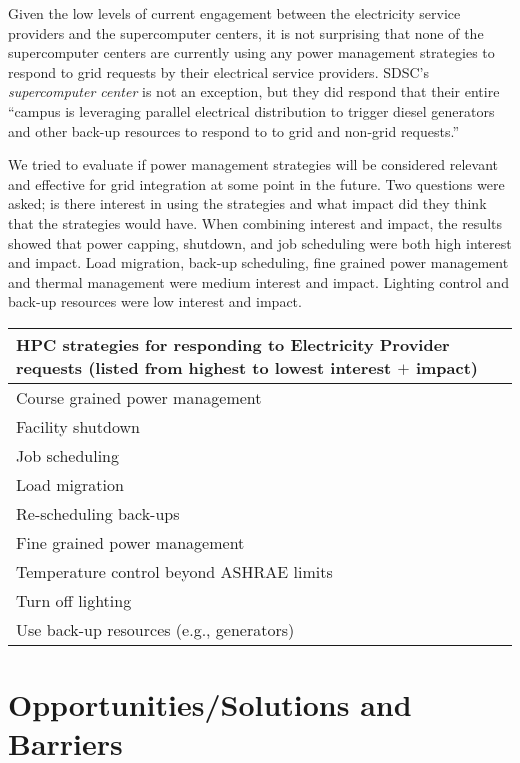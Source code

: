 \documentclass{llncs}
\begin{document}
Given the low levels of current engagement between the electricity service
providers and the supercomputer centers, it is not surprising that none of
the supercomputer centers are currently using any power management
strategies to respond to grid requests by their electrical service
providers. SDSC's \textit{supercomputer center} is not an exception, but they did respond that their
entire ``campus is leveraging parallel electrical distribution to trigger
diesel generators and other back-up resources to respond to to grid and
non-grid requests.''

We tried to evaluate if power management strategies will be considered
relevant and effective for grid integration at some point in the future. Two
questions were asked; is there interest in using the strategies and what
impact did they think that the strategies would have. When combining
interest and impact, the results showed that power capping, shutdown, and
job scheduling were both high interest and impact. Load migration, back-up
scheduling, fine grained power management and thermal management were medium
interest and impact. Lighting control and back-up resources were low
interest and impact.


\begin{table}[htbp]

\begin{center}
\begin{tabular}{|p{299pt}|}
\hline
\textbf{HPC strategies for responding to Electricity Provider requests (listed from highest to lowest interest }$+$\textbf{ impact)} \\
\hline
Course grained power management \\
\hline
Facility shutdown \\
\hline
Job scheduling \\
\hline
Load migration \\
\hline
Re-scheduling back-ups \\
\hline
Fine grained power management \\
\hline
Temperature control beyond ASHRAE limits \\
\hline
Turn off lighting \\
\hline
Use back-up resources (e.g., generators) \\
\hline
\end{tabular}
\label{tab1}
\end{center}
\end{table}



\section{Opportunities/Solutions and Barriers} 
\end{document}

